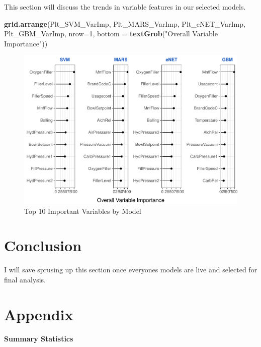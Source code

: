 \documentclass[]{report}
\newenvironment{Shaded}{\begin{snugshade}}{\end{snugshade}}
\newcommand{\DataTypeTok}[1]{\textcolor[rgb]{0.13,0.29,0.53}{#1}}
\newcommand{\DecValTok}[1]{\textcolor[rgb]{0.00,0.00,0.81}{#1}}
\newcommand{\KeywordTok}[1]{\textcolor[rgb]{0.13,0.29,0.53}{\textbf{#1}}}
\newcommand{\NormalTok}[1]{#1}
\newcommand{\StringTok}[1]{\textcolor[rgb]{0.31,0.60,0.02}{#1}}
\begin{document}
This section will discuss the trends in variable features in our
selected models.

\begin{Shaded}
\begin{Highlighting}[]
\KeywordTok{grid.arrange}\NormalTok{(Plt_SVM_VarImp, Plt_MARS_VarImp, Plt_eNET_VarImp, Plt_GBM_VarImp, }\DataTypeTok{nrow=}\DecValTok{1}\NormalTok{, }\DataTypeTok{bottom =} \KeywordTok{textGrob}\NormalTok{(}\StringTok{"Overall Variable Importance"}\NormalTok{))}
\end{Highlighting}
\end{Shaded}

\begin{figure}
\centering
\includegraphics{Proj2-JM_files/figure-latex/unnamed-chunk-11-1.pdf}
\caption{Top 10 Important Variables by Model}
\end{figure}

\hypertarget{conclusion}{%
\chapter{Conclusion}\label{conclusion}}

I will save sprusing up this section once everyones models are live and
selected for final analysis.

\hypertarget{Appendix}{%
\chapter*{Appendix}\label{Appendix}}

\hypertarget{summary-statistics}{%
\subsubsection{Summary Statistics}\label{summary-statistics}}
\end{document}

